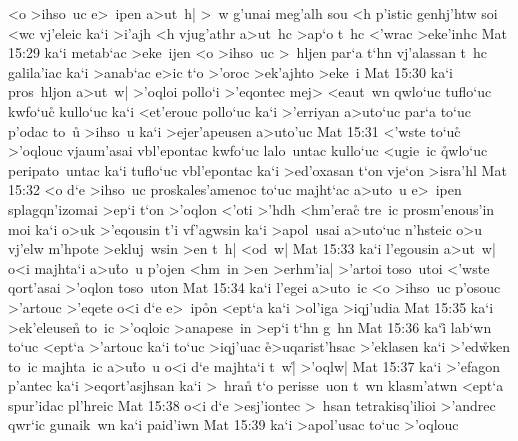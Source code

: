 <o
>ihso~uc
e>~ipen
a>ut~h|
>~w
g'unai
meg'alh
sou
<h
p'istic
genhj'htw
soi
<wc
vj'eleic
ka`i
>i'ajh
<h
vjug'athr
a>ut~hc
>ap`o
t~hc
<'wrac
>eke'inhc\bibvsend
\vs Mat 15:29
ka`i
metab`ac
>eke~ijen
<o
>ihso~uc
>~hljen
par`a
t`hn
vj'alassan
t~hc
galila'iac
ka`i
>anab`ac
e>ic
t`o
>'oroc
>ek'ajhto
>eke~i\bibvsend
\vs Mat 15:30
ka`i
pros~hljon
a>ut~w|
>'oqloi
pollo`i
>'eqontec
mej>
<eaut~wn
qwlo`uc
tuflo`uc
kwfo`uc\r{}
kullo`uc
ka`i
<et'erouc
pollo`uc
ka`i
>'erriyan
a>uto`uc
par`a
to`uc
p'odac
to~u\r{}
>ihso~u
ka`i
>ejer'apeusen
a>uto'uc\bibvsend
\vs Mat 15:31
<'wste
to`uc\r{}
>'oqlouc
vjaum'asai
vbl'epontac
kwfo`uc
lalo~untac
kullo`uc
<ugie~ic
\r{q}wlo`uc
peripato~untac
ka`i
tuflo`uc
vbl'epontac
ka`i
>ed'oxasan
t`on
vje`on
>isra'hl\bibvsend
\vs Mat 15:32
<o
d`e
>ihso~uc
proskales'amenoc
to`uc
majht`ac
a>uto~u
e>~ipen
splagqn'izomai
>ep`i
t`on
>'oqlon
<'oti
>'hdh
<hm'era\r{c}
tre~ic
prosm'enous'in
moi
ka`i
o>uk
>'eqousin
t'i
vf'agwsin
ka`i
>apol~usai
a>uto`uc
n'hsteic
o>u
vj'elw
m'hpote
>ekluj~wsin
>en
t~h|
<od~w|\bibvsend
\vs Mat 15:33
ka`i
l'egousin
a>ut~w|
o<i
majhta`i
a>u\r{t}o~u
p'ojen
<hm~in
>en
>erhm'ia|
>'artoi
toso~utoi
<'wste
qort'asai
>'oqlon
toso~uton\bibvsend
\vs Mat 15:34
ka`i
l'egei
a>uto~ic
<o
>ihso~uc
p'osouc
>'artouc
>'eqete
o<i
d`e
e>~ip\r{o}n
<ept`a
ka`i
>ol'iga
>iqj'udia\bibvsend
\vs Mat 15:35
ka`i
>ek'eleusen\r{}
to~ic
>'oqloic
>anapese~in
>ep`i
t`hn
g~hn\bibvsend
\vs Mat 15:36
ka`i\r{}
lab`wn
to`uc
<ept`a
>'artouc
ka`i
to`uc
>iqj'uac
\r{e}>uqarist'hsac
>'eklasen
ka`i
>'ed\r{w}ken
to~ic
majhta~ic
a>u\r{t}o~u
o<i
d`e
majhta`i
t~w|\r{}
>'oqlw|\bibvsend
\vs Mat 15:37
ka`i
>'efagon
p'antec
ka`i
>eqort'asjhsan
ka`i
>~hran\r{}
t`o
perisse~uon
t~wn
klasm'atwn
<ept`a
spur'idac
pl'hreic\bibvsend
\vs Mat 15:38
o<i
d`e
>esj'iontec
>~hsan
tetrakisq'ilioi
>'andrec
qwr`ic
gunaik~wn
ka`i
paid'iwn\bibvsend
\vs Mat 15:39
ka`i
>apol'usac
to`uc
>'oqlouc
